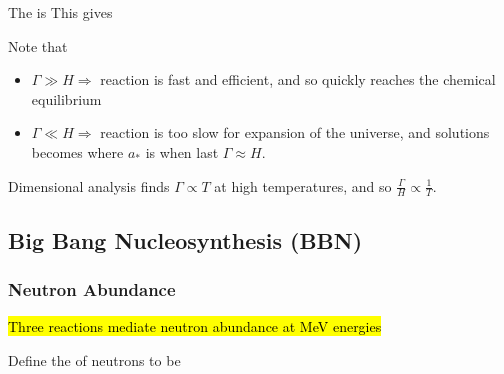 \documentclass{article}
\begin{document}
\begin{definition}
The  is 
This gives 
\end{definition}

Note that
\begin{itemize}
    \item $\Gamma \gg H \Rightarrow$ reaction is fast and efficient, and so quickly reaches the chemical equilibrium 
    \item $\Gamma \ll H \Rightarrow$ reaction is too slow for expansion of the universe, and solutions becomes 
    where $a_\ast$ is when last $\Gamma \approx H$. 
\end{itemize}

Dimensional analysis finds $\Gamma \propto T$ at high temperatures, and so $\frac{\Gamma}{H}\propto\frac{1}{T}$.

\subsection{Big Bang Nucleosynthesis (BBN)}

\subsubsection*{Neutron Abundance}
\hl{Three reactions mediate neutron abundance at MeV energies} 
\begin{definition}
Define the  of neutrons to be 
\end{definition}
\end{document}
